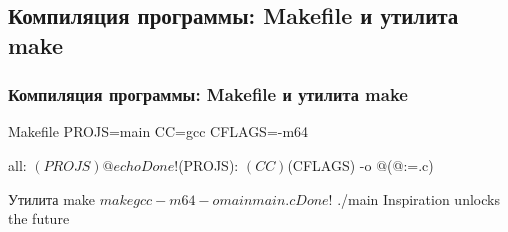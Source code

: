 \documentclass[10pt,pdf,hyperref={unicode}]{beamer}
\begin{document}
	\subsection{Компиляция программы: Makefile и утилита make}
	\begin{frame}[fragile]
	
		\frametitle{Компиляция программы: Makefile и утилита make}
		
		\begin{shCode}{Makefile}
		PROJS=main
		CC=gcc
		CFLAGS=-m64

		all: $(PROJS)
			@echo Done!
		$(PROJS):
			$(CC) $(CFLAGS) -o $@ $(@:=.c) \end{shCode}
			
		\begin{shCode}{Утилита make}
		$ make
			gcc -m64 -o main main.c
		Done!
		$ ./main
			Inspiration unlocks the future \end{shCode}
		
	\end{frame}
	
	
 
\end{document}

